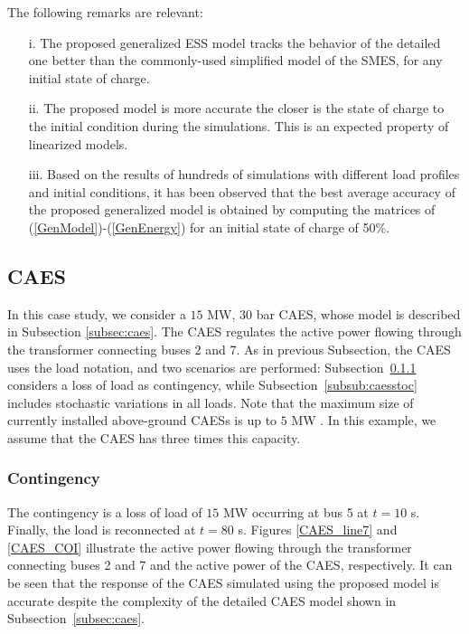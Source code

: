 \documentclass[journal, a4paper]{IEEEtran}
\begin{document}
The following remarks are relevant:
\begin{itemize}
\item[i. ] The proposed generalized ESS model tracks the beha\-vior of the detailed one better than
the commonly-used simplified model of the SMES, for any initial state of charge.
\item[ii. ] The proposed model is more accurate the closer is the state of charge to the initial condition
during the simulations. This is an expected property of linearized models.
\item[iii. ] Based on the results of hundreds of simulations with different load profiles and initial 
conditions, it has been observed that the best average accuracy of the proposed
generalized model is obtained by computing the matrices of (\ref{GenModel})-(\ref{GenEnergy}) for an
initial state of charge of 50\%.
\end{itemize}





\subsection{CAES}
\label{subsec:caesTDS}

In this case study, we consider a $15$ MW, $30$ bar CAES, whose
model is described in Subsection \ref{subsec:caes}. The CAES regulates
the active power flowing through the transformer connecting buses 2
and 7.  As in previous Subsection, the CAES uses the load
notation, and two scenarios are performed:
Subsection~\ref{subsub:caesdeterm} considers a loss of load as contingency,
while Subsection~\ref{subsub:caesstoc} includes stochastic variations in all loads.
Note that the maximum size of currently installed
above-ground CAESs is up to $5$ MW \cite{ibrahim:08}.  In this
example, we assume that the CAES has three times this capacity. \\

\subsubsection{Contingency}
\label{subsub:caesdeterm}
The contingency is a loss of load of $15$ MW occurring
at bus 5 at $t = 10$ s.  Finally, the load is reconnected at $t = 80$
s.  Figures \ref{CAES_line7} and \ref{CAES_COI} illustrate the active
power flowing through the transformer connecting buses 2 and 7 and the
active power of the CAES, respectively. It can be seen
  that the response of the CAES simulated using the proposed model is
  accurate despite the complexity of the detailed CAES model shown in
  Subsection~\ref{subsec:caes}.
\end{document}
